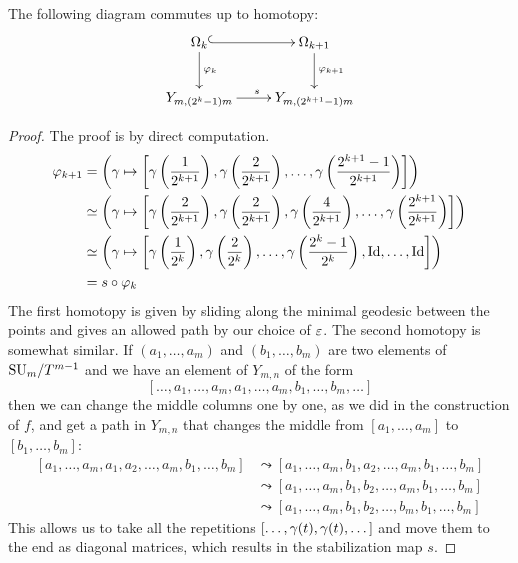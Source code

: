 \begin{lemma}
  \label{lem:com}
  The following diagram commutes up to homotopy:
  \[ \xymatrix{\Omega_k \ar@{^(->}[r] \ar[d]^{\varphi_k} & \Omega_{k+1}
  \ar[d]^{\varphi_{k+1}} \\
  Y_{m,(2^k-1)m} \ar[r]^{s} & Y_{m,(2^{k+1}-1)m} } \]
\end{lemma}
\begin{proof}
  The proof is by direct computation.
  \begin{align*}
    \varphi_{k+1} &= \left( \gamma \mapsto \left[
        \gamma\left(\frac{1}{2^{k+1}}\right),
        \gamma\left(\frac{2}{2^{k+1}}\right), \dots,
        \gamma\left(\frac{2^{k+1}-1}{2^{k+1}}\right) \right]\right) \\
    &\simeq \left(\gamma \mapsto \left[ \gamma\left(\frac{2}{2^{k+1}}\right),
      \gamma\left(\frac{2}{2^{k+1}}\right),
      \gamma\left(\frac{4}{2^{k+1}}\right), \dots,
      \gamma\left(\frac{2^{k+1}}{2^{k+1}}\right) \right]\right) \\
    &\simeq \left(\gamma\mapsto \left[ \gamma\left(\frac{1}{2^{k}}\right),
      \gamma\left(\frac{2}{2^{k}}\right), \dots,
      \gamma\left(\frac{2^k-1}{2^k}\right), \operatorname{Id},\dots,\operatorname{Id} \right] \right)\\
    &= s\circ \varphi_k
  \end{align*}
  The first homotopy is given by sliding along the minimal geodesic
  between the points and gives an allowed path by our choice of
  $\varepsilon$. The second homotopy is somewhat similar. If $(a_1,\dots,a_m)$
  and $(b_1,\dots,b_m)$ are two elements of $\mathrm{SU}_{m}/T^{m-1}$ and we have an
  element of $Y_{m,n}$ of the form
  \[ \left[ \dots, a_1,\dots,a_m,a_1,\dots,a_m,b_1,\dots,b_m,\dots
  \right]\]
  then we can change the middle columns one by one, as we did in
  the construction of $f$, and get a path in $Y_{m,n}$ that changes
  the middle from $[a_1,\dots,a_m]$ to $[b_1,\dots,b_m]$:
  \begin{align*}
    \left[a_1,\dots,a_m,a_1,a_2,\dots,a_m,b_1,\dots,b_m \right] 
    &\leadsto
    \left[a_1,\dots,a_m,b_1,a_2,\dots,a_m,b_1,\dots,b_m\right] \\ 
    &\leadsto
    \left[a_1,\dots,a_m,b_1,b_2,\dots,a_m,b_1,\dots,b_m\right] \\  
    &\leadsto
    \left[a_1,\dots,a_m,b_1,b_2,\dots,b_m,b_1,\dots,b_m\right]  
  \end{align*}
  This allows us to take all the repetitions
  $\left[\dots,\gamma(t),\gamma(t),\dots\right]$ and move them to the end as
  diagonal matrices, which results in the stabilization map $s$.
\end{proof}

